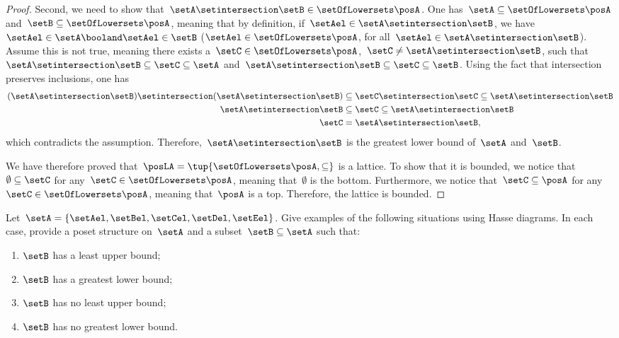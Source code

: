 \begin{proof}
    Second, we need to show that~$\setA \setintersection \setB\in \setOfLowersets \posA$.
    One has~$\setA \subseteq \setOfLowersets \posA$ and~$\setB\subseteq \setOfLowersets \posA$, meaning that by definition, if~$\setAel\in \setA\setintersection \setB$, we have~$\setAel \in \setA\booland \setAel\in \setB$ ($\setAel\in \setOfLowersets \posA$, for all~$\setAel\in \setA \setintersection \setB$).
    Assume this is not true, meaning there exists a~$\setC\in \setOfLowersets \posA$,~$\setC\neq \setA\setintersection \setB$, such that~$\setA\setintersection \setB\subseteq \setC\subseteq \setA$ and~$\setA\setintersection \setB\subseteq \setC\subseteq \setB$.
    Using the fact that intersection preserves inclusions, one has
    \begin{equation}
        \begin{aligned}
            (\setA\setintersection \setB)
            \setintersection (\setA\setintersection \setB) & \subseteq \setC \setintersection \setC \subseteq \setA\setintersection \setB \\
            \setA\setintersection \setB                    & \subseteq \setC\subseteq \setA\setintersection \setB                         \\
            \setC                                          & =\setA\setintersection \setB,
        \end{aligned}
    \end{equation}
    which contradicts the assumption.
    Therefore,~$\setA\setintersection \setB$ is the greatest lower bound of~$\setA$ and~$\setB$.

    We have therefore proved that~$\posLA=\tup{\setOfLowersets \posA,\subseteq}$ is a lattice.
    To show that it is bounded, we notice that~$\emptyset \subseteq \setC$ for any~$\setC\in \setOfLowersets \posA$, meaning that~$\emptyset$ is the bottom.
    Furthermore, we notice that~$\setC\subseteq \posA$ for any~$\setC\in \setOfLowersets \posA$, meaning that~$\posA$ is a top.
    Therefore, the lattice is bounded.
\end{proof}

\vfill

\begin{gradedexercise}
    \label{ex:UpperLowerBounds}
    Let~$\setA = \{\setAel, \setBel, \setCel, \setDel, \setEel \}$.
    Give examples of the following situations using Hasse diagrams.
    In each case, provide a poset structure on~$\setA$ and a subset~$\setB \subseteq \setA$ such that:
    \begin{enumerate}
        \item $\setB$ has a least upper bound;
        \item $\setB$ has a greatest lower bound;
        \item $\setB$ has no least upper bound;
        \item $\setB$ has no greatest lower bound.
    \end{enumerate}
\end{gradedexercise}


